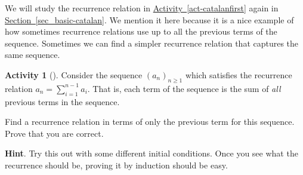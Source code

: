 \documentclass[10pt,]{book}
\theoremstyle{plain}
\theoremstyle{definition}
\theoremstyle{definition}
\theoremstyle{definition}
\newtheorem{activity}[project]{Activity}
\numberwithin{equation}{chapter}
\begin{document}
\hypertarget{p-918}{}%
We will study the recurrence relation in \hyperref[act-catalanfirst]{Activity~\ref{act-catalanfirst}} again in \hyperref[sec_basic-catalan]{Section~\ref{sec_basic-catalan}}.  We mention it here because it is a nice example of how sometimes recurrence relations use up to all the previous terms of the sequence.  Sometimes we can find a simpler recurrence relation that captures the same sequence.%
\begin{activity}[]\label{activity-135}
\hypertarget{p-919}{}%
Consider the sequence \((a_n)_{n \ge 1}\) which satisfies the recurrence relation \(a_n = \sum_{i = 1}^{n-1} a_i\).  That is, each term of the sequence is the sum of \emph{all} previous terms in the sequence.%
\par
\hypertarget{p-920}{}%
Find a recurrence relation in terms of only the previous term for this sequence.  Prove that you are correct.%
\par\smallskip%
\noindent\textbf{Hint}.\hypertarget{hint-101}{}\quad%
\hypertarget{p-921}{}%
Try this out with some different initial conditions.  Once you see what the recurrence should be, proving it by induction should be easy.%
\end{activity}
\typeout{************************************************}
\typeout{************************************************}
\end{document}
